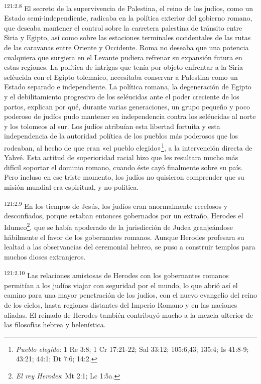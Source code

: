 \par
\textsuperscript{121:2.8} El secreto de la supervivencia de Palestina, el reino de los judíos, como un Estado semi-independiente, radicaba en la política exterior del gobierno romano, que deseaba mantener el control sobre la carretera palestina de tránsito entre Siria y Egipto, así como sobre las estaciones terminales occidentales de las rutas de las caravanas entre Oriente y Occidente. Roma no deseaba que una potencia cualquiera que surgiera en el Levante pudiera refrenar su expansión futura en estas regiones. La política de intrigas que tenía por objeto enfrentar a la Siria seléucida con el Egipto tolemaico, necesitaba conservar a Palestina como un Estado separado e independiente. La política romana, la degeneración de Egipto y el debilitamiento progresivo de los seléucidas ante el poder creciente de los partos, explican por qué, durante varias generaciones, un grupo pequeño y poco poderoso de judíos pudo mantener su independencia contra los seléucidas al norte y los tolomeos al sur. Los judíos atribuían esta libertad fortuita y esta independencia de la autoridad política de los pueblos más poderosos que los rodeaban, al hecho de que eran «el pueblo elegido»\footnote{\textit{Pueblo elegido}: 1 Re 3:8; 1 Cr 17:21-22; Sal 33:12; 105:6,43; 135:4; Is 41:8-9; 43:21; 44:1; Dt 7:6; 14:2.}, a la intervención directa de Yahvé. Esta actitud de superioridad racial hizo que les resultara mucho más difícil soportar el dominio romano, cuando éste cayó finalmente sobre su país. Pero incluso en ese triste momento, los judíos no quisieron comprender que su misión mundial era espiritual, y no política.

\par
\textsuperscript{121:2.9} En los tiempos de Jesús, los judíos eran anormalmente recelosos y desconfiados, porque estaban entonces gobernados por un extraño, Herodes el Idumeo\footnote{\textit{El rey Herodes}: Mt 2:1; Lc 1:5a.}, que se había apoderado de la jurisdicción de Judea granjeándose hábilmente el favor de los gobernantes romanos. Aunque Herodes profesara su lealtad a las observancias del ceremonial hebreo, se puso a construir templos para muchos dioses extranjeros.

\par
\textsuperscript{121:2.10} Las relaciones amistosas de Herodes con los gobernantes romanos permitían a los judíos viajar con seguridad por el mundo, lo que abrió así el camino para una mayor penetración de los judíos, con el nuevo evangelio del reino de los cielos, hasta regiones distantes del Imperio Romano y en las naciones aliadas. El reinado de Herodes también contribuyó mucho a la mezcla ulterior de las filosofías hebrea y helenística.

